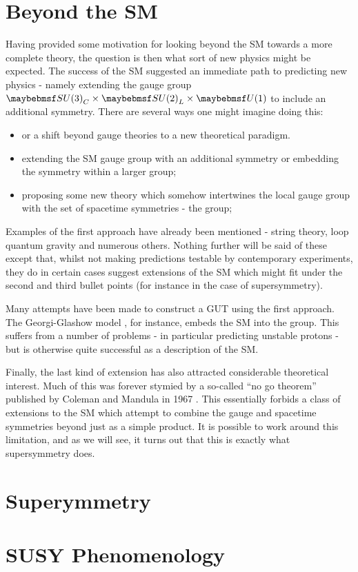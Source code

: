 \section{Beyond the \acl{SM}}
Having provided some motivation for looking beyond the \ac{SM} towards a more
complete theory, the question is then what sort of new physics might be
expected. The success of the \ac{SM} suggested an immediate path to predicting
new physics - namely extending the gauge group
$\SUthree_C\times\SUtwo_L\times\Uone$ to include an additional symmetry. There
are several ways one might imagine doing this:
\begin{itemize}
\item or a shift beyond gauge theories to a new theoretical paradigm.
\item extending the \ac{SM} gauge group with an additional symmetry or embedding
  the symmetry within a larger group;
\item proposing some new theory which somehow intertwines the local gauge group
  with the set of spacetime symmetries - the \Poincare group;

\end{itemize}
Examples of the first approach have already been mentioned - string theory, loop
quantum gravity and numerous others. Nothing further will be said of these
except that, whilst not making predictions testable by contemporary experiments,
they do in certain cases suggest extensions of the \ac{SM} which might fit under
the second and third bullet points (for instance in the case of supersymmetry).

Many attempts have been made to construct a \acl{GUT} using the first
approach. The Georgi-Glashow model \cite{georgi_glashow}, for instance, embeds
the \ac{SM} into the \SUfive group. This suffers from a number of problems - in
particular predicting unstable protons - but is otherwise quite successful as a
description of the \ac{SM}.

Finally, the last kind of extension has also attracted considerable theoretical
interest. Much of this was forever stymied by a so-called ``no go theorem''
published by Coleman and Mandula in 1967 \cite{coleman_mandual}. This
essentially forbids a class of extensions to the \ac{SM} which attempt to
combine the gauge and spacetime symmetries beyond just as a simple product. It
is possible to work around this limitation, and as we will see, it turns out
that this is exactly what supersymmetry does.

\section{Superymmetry}

\section{\ac{SUSY} Phenomenology}

